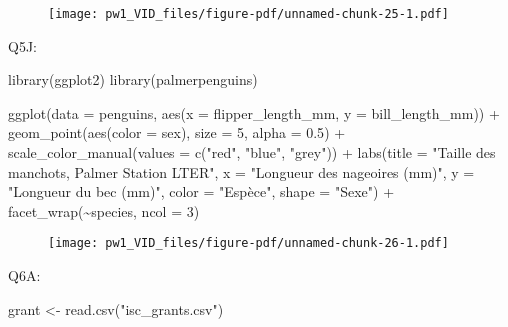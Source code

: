 \documentclass[
  letterpaper,
  DIV=11,
  numbers=noendperiod]{scrartcl}
\newenvironment{Shaded}{}{}
\newcommand{\AttributeTok}[1]{\textcolor[rgb]{0.84,0.23,0.29}{#1}}
\newcommand{\DecValTok}[1]{\textcolor[rgb]{0.00,0.36,0.77}{#1}}
\newcommand{\FloatTok}[1]{\textcolor[rgb]{0.00,0.36,0.77}{#1}}
\newcommand{\FunctionTok}[1]{\textcolor[rgb]{0.44,0.26,0.76}{#1}}
\newcommand{\NormalTok}[1]{\textcolor[rgb]{0.14,0.16,0.18}{#1}}
\newcommand{\OtherTok}[1]{\textcolor[rgb]{0.44,0.26,0.76}{#1}}
\newcommand{\SpecialCharTok}[1]{\textcolor[rgb]{0.00,0.36,0.77}{#1}}
\newcommand{\StringTok}[1]{\textcolor[rgb]{0.01,0.18,0.38}{#1}}
\begin{document}
\begin{figure}[H]

{\centering \texttt{[image: pw1\_VID\_files/figure-pdf/unnamed-chunk-25-1.pdf]}

}

\end{figure}

Q5J:

\begin{Shaded}
\begin{Highlighting}[]
\FunctionTok{library}\NormalTok{(ggplot2)}
\FunctionTok{library}\NormalTok{(palmerpenguins)}

\FunctionTok{ggplot}\NormalTok{(}\AttributeTok{data =}\NormalTok{ penguins, }\FunctionTok{aes}\NormalTok{(}\AttributeTok{x =}\NormalTok{ flipper\_length\_mm, }\AttributeTok{y =}\NormalTok{ bill\_length\_mm)) }\SpecialCharTok{+}
  \FunctionTok{geom\_point}\NormalTok{(}\FunctionTok{aes}\NormalTok{(}\AttributeTok{color =}\NormalTok{ sex), }\AttributeTok{size =} \DecValTok{5}\NormalTok{, }\AttributeTok{alpha =} \FloatTok{0.5}\NormalTok{) }\SpecialCharTok{+}
  \FunctionTok{scale\_color\_manual}\NormalTok{(}\AttributeTok{values =} \FunctionTok{c}\NormalTok{(}\StringTok{"red"}\NormalTok{, }\StringTok{"blue"}\NormalTok{, }\StringTok{"grey"}\NormalTok{)) }\SpecialCharTok{+}
  \FunctionTok{labs}\NormalTok{(}\AttributeTok{title =} \StringTok{"Taille des manchots, Palmer Station LTER"}\NormalTok{,}
       \AttributeTok{x =} \StringTok{"Longueur des nageoires (mm)"}\NormalTok{,}
       \AttributeTok{y =} \StringTok{"Longueur du bec (mm)"}\NormalTok{,}
       \AttributeTok{color =} \StringTok{"Espèce"}\NormalTok{,}
       \AttributeTok{shape =} \StringTok{"Sexe"}\NormalTok{) }\SpecialCharTok{+}
  \FunctionTok{facet\_wrap}\NormalTok{(}\SpecialCharTok{\textasciitilde{}}\NormalTok{species, }\AttributeTok{ncol =} \DecValTok{3}\NormalTok{)}
\end{Highlighting}
\end{Shaded}

\begin{figure}[H]

{\centering \texttt{[image: pw1\_VID\_files/figure-pdf/unnamed-chunk-26-1.pdf]}

}

\end{figure}

Q6A:

\begin{Shaded}
\begin{Highlighting}[]
\NormalTok{grant }\OtherTok{\textless{}{-}} \FunctionTok{read.csv}\NormalTok{(}\StringTok{"isc\_grants.csv"}\NormalTok{)}
\end{Highlighting}
\end{Shaded}
\end{document}
